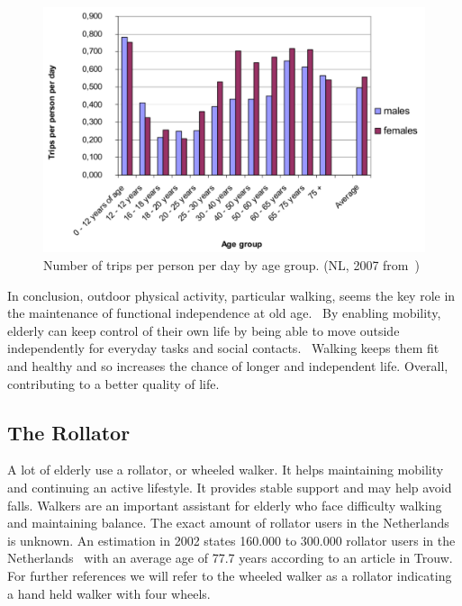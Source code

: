 \begin{figure}[h]
\includegraphics[width=\textwidth]{img/I3_numberOfTripsPerPersonPerDayByAge.pdf}
\centering
\caption[Number of trips per person per day by age group]{
Number of trips per person per day by age group. (NL, 2007 from~\cite{countryReport}) \label{percwalk}}
\end{figure}

In conclusion, outdoor physical activity, particular walking, seems the key role in the maintenance of functional independence at old age.~\cite{Rantakokko2009} By enabling mobility, elderly can keep control of their own life by being able to move outside independently for everyday tasks and social contacts.~\cite{MENSenSTRAAT2014} Walking keeps them fit and healthy and so increases the chance of longer and independent life. Overall, contributing to a better quality of life. 

\subsection{The Rollator}
A lot of elderly use a rollator, or wheeled walker. It helps maintaining mobility and continuing an active lifestyle. It provides stable support and may help avoid falls. Walkers are an important assistant for elderly who face difficulty walking and maintaining balance. The exact amount of rollator users in the Netherlands is unknown. An estimation in 2002 states 160.000 to 300.000 rollator users in the Netherlands~\cite{VeiligheidNL2012} with an average age of 77.7 years according to an article in Trouw.~\cite{Trouw2003} 
For further references we will refer to the wheeled walker as a rollator indicating a hand held walker with four wheels. 

